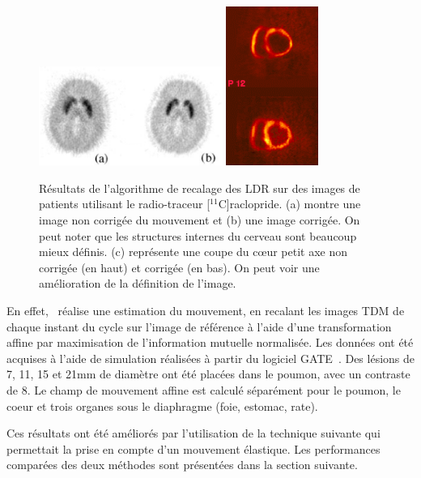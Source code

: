 \begin{figure}[h!]
	\begin{center}
		\includegraphics[width=6cm]{images/bloomfield2003design} \includegraphics[width=3cm]{images/livieratos2005rigid}
	\end{center}
	\caption[Résultats de l'algorithme de recalage des LDR sur des images de patients]{Résultats de l'algorithme de recalage des LDR sur des images de patients utilisant le radio-traceur [$^{11}$C]raclopride. (a) montre une image non corrigée du mouvement et (b) une image corrigée. On peut noter que les structures internes du cerveau sont beaucoup mieux définis. (c) représente une coupe du c\oe{}ur petit axe non corrigée (en haut) et corrigée (en bas). On peut voir une amélioration de la définition de l'image.} 
	\label{fig:ameliorationLOR}
\end{figure}
 

En effet,~\cite{lamare2007respiratory} réalise une estimation du mouvement, en recalant les images TDM de chaque instant du cycle sur l'image de référence à l'aide d'une transformation affine par maximisation de l'information mutuelle normalisée. Les données ont été acquises à l'aide de simulation réalisées à partir du logiciel GATE~\cite{jan2004gate}. Des lésions de 7, 11, 15 et 21mm de diamètre ont été placées dans le poumon, avec un contraste de 8. Le champ de mouvement affine est calculé séparément pour le poumon, le coeur et trois organes sous le diaphragme (foie, estomac, rate).

Ces résultats ont été améliorés par l'utilisation de la technique suivante qui permettait la prise en compte d'un mouvement élastique. Les performances comparées des deux méthodes sont présentées dans la section suivante.

